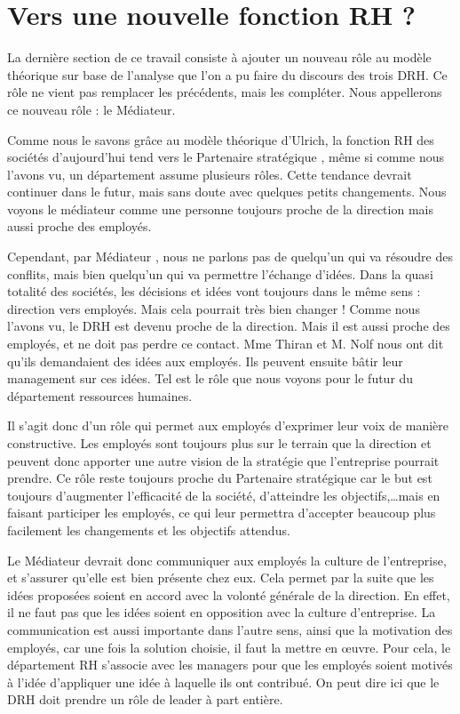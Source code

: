 \section{Vers une nouvelle fonction RH ?}

La dernière section de ce travail consiste à ajouter un nouveau rôle au modèle théorique sur base de l'analyse que l'on a pu faire du discours des trois DRH. Ce rôle ne vient pas remplacer les précédents, mais les compléter.  Nous appellerons ce nouveau rôle : le \og{}Médiateur\fg{}.\newline

Comme nous le savons grâce au modèle théorique d'Ulrich, la fonction RH des sociétés d'aujourd'hui tend vers le \og{}Partenaire stratégique \fg{}, même si comme nous l'avons vu, un département assume plusieurs rôles. Cette tendance devrait continuer dans le futur, mais sans doute avec quelques petits changements. Nous voyons le \og médiateur \fg{} comme une personne toujours proche de la direction mais aussi proche des employés. \newline

Cependant, par \og{}Médiateur \fg{}, nous ne parlons pas de quelqu'un qui va résoudre des conflits, mais bien quelqu'un qui va permettre l'échange d'idées. Dans la quasi totalité des sociétés, les décisions et idées vont toujours dans le même sens : direction vers employés. Mais cela pourrait très bien changer ! Comme nous l'avons vu, le DRH est devenu proche de la direction. Mais il est aussi proche des employés, et ne doit pas perdre ce contact. Mme Thiran et M. Nolf nous ont dit qu'ils demandaient des idées aux employés. Ils peuvent ensuite bâtir leur management sur ces idées. Tel est le rôle que nous voyons pour le futur du département ressources humaines. \newline

Il s'agit donc d'un rôle qui permet aux employés d'exprimer leur voix de manière constructive. Les employés sont toujours plus sur le terrain que la direction et peuvent donc apporter une autre vision de la stratégie que l'entreprise pourrait prendre. Ce rôle reste toujours proche du \og{}Partenaire stratégique \fg{} car le but est toujours d'augmenter l'efficacité de la société, d'atteindre les objectifs,\ldots mais en faisant participer les employés, ce qui leur permettra d'accepter beaucoup plus facilement les changements et les objectifs attendus.\newline

Le \og{}Médiateur\fg{} devrait donc communiquer aux employés la culture de l'entreprise, et s'assurer qu'elle est bien présente chez eux. Cela permet par la suite que les idées proposées soient en accord avec la volonté générale de la direction. En effet, il ne faut pas que les idées soient en opposition avec la culture d'entreprise. La communication est aussi importante dans l'autre sens, ainsi que la motivation des employés, car une fois la solution choisie, il faut la mettre en \oe{}uvre. Pour cela, le département RH s'associe avec les managers pour que les employés soient motivés à l'idée d'appliquer une idée à laquelle ils ont contribué. On peut dire ici que le DRH doit prendre un rôle de leader à part entière. \newline


